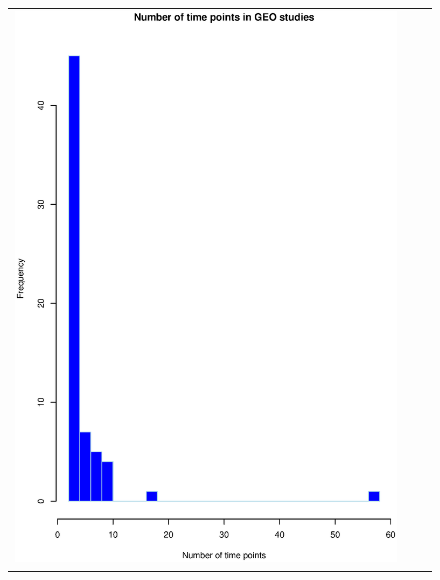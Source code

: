 \documentclass[a4paper]{article}
\begin{document}
\begin{figure}[h!]
\centering
\begin{tabular}{ccc}
\includegraphics[scale=0.24]{GEOtime.eps} &

\end{tabular}
\end{figure}
\end{document}
